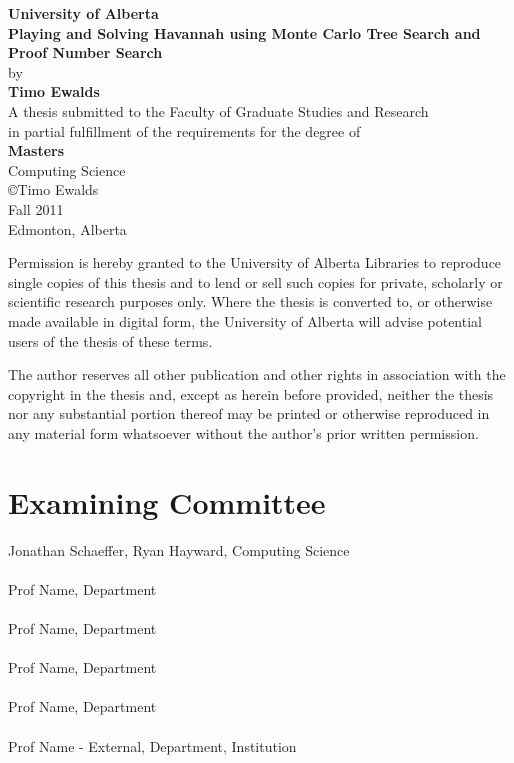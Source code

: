 \documentclass[12pt, letterpaper]{report}
\def\name{Timo Ewalds}
\def\thesistitle{Playing and Solving Havannah using Monte Carlo Tree Search and Proof Number Search}
\def\supervisor{Jonathan Schaeffer, Ryan Hayward}
\def\coma{Prof Name}
\def\comb{Prof Name}
\def\comc{Prof Name}
\def\comd{Prof Name}
\def\come{Prof Name - External}
\def\superloc{Computing Science}
\def\loca{Department}
\def\locb{Department}
\def\locc{Department}
\def\locd{Department}
\def\loce{Department, Institution}
\def\program{Masters}  %
\def\school{University of Alberta}
\def\semester{Fall 2011}  %
\def\dept{Computing Science}  %
\numberwithin{equation}{section}
\begin{document}
  \setcounter{page}{-99}  %
  \thispagestyle{empty}
  

  \begin{center}
    \Large{\textbf{\school}}  \\ [.6in]
    \Large{\textbf{\thesistitle}} \\ [.1in]
    \normalsize{by} \\ [.1in]
    \Large{\textbf{\name}}  \\ [.6in]
    \normalsize{A thesis submitted to the Faculty of Graduate Studies and Research \\ 
    in partial fulfillment of the requirements for the degree of} \\ [0.1in]
    \Large{\textbf{\program}} \\ [.1in]
    \normalsize{\dept} \\ [0.6in]  
    \scriptsize{\copyright\:\name} \\
    \scriptsize{\semester} \\
    \scriptsize{Edmonton, Alberta} \\ [0.6in]  
    \scriptsize{Permission is hereby granted to the University of Alberta Libraries to reproduce single copies of this thesis and to lend or sell such copies for private, scholarly or scientific research purposes only. Where the thesis is converted to, or otherwise made available in digital form, the University of Alberta will advise potential users of the thesis of these terms.
    
The author reserves all other publication and other rights in association with the copyright in the thesis and, except as herein before provided, neither the thesis nor any substantial portion thereof may be printed or otherwise reproduced in any material form whatsoever without the author's prior written permission.}
  \end{center}

  \newpage
  \chapter*{Examining Committee}
  \thispagestyle{empty}
     \supervisor, \; \superloc \\ \\
     \coma, \; \loca \\ \\
     \comb, \; \locb \\ \\
     \comc, \; \locc \\ \\
     \comd, \; \locd \\ \\
     \come, \; \loce
  
\end{document}
